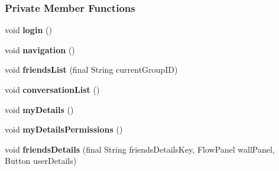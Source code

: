 \subsubsection*{Private Member Functions}
\begin{DoxyCompactItemize}
\item 
\hypertarget{classballmerpeak_1_1turtlenet_1_1client_1_1frontend_a0e5a972d2f4619b2ebc2257ae1ca1288}{void {\bfseries login} ()}\label{classballmerpeak_1_1turtlenet_1_1client_1_1frontend_a0e5a972d2f4619b2ebc2257ae1ca1288}

\item 
\hypertarget{classballmerpeak_1_1turtlenet_1_1client_1_1frontend_ae632d3d6bfd5ed81da02b4bf53fc9327}{void {\bfseries navigation} ()}\label{classballmerpeak_1_1turtlenet_1_1client_1_1frontend_ae632d3d6bfd5ed81da02b4bf53fc9327}

\item 
\hypertarget{classballmerpeak_1_1turtlenet_1_1client_1_1frontend_a2fe4471c89ba970c517388d212b617d6}{void {\bfseries friends\-List} (final String current\-Group\-I\-D)}\label{classballmerpeak_1_1turtlenet_1_1client_1_1frontend_a2fe4471c89ba970c517388d212b617d6}

\item 
\hypertarget{classballmerpeak_1_1turtlenet_1_1client_1_1frontend_a87b09347320292a852b37e97c01b2ea2}{void {\bfseries conversation\-List} ()}\label{classballmerpeak_1_1turtlenet_1_1client_1_1frontend_a87b09347320292a852b37e97c01b2ea2}

\item 
\hypertarget{classballmerpeak_1_1turtlenet_1_1client_1_1frontend_aa0f7dea95f68603b6c8e17c8b97733c7}{void {\bfseries my\-Details} ()}\label{classballmerpeak_1_1turtlenet_1_1client_1_1frontend_aa0f7dea95f68603b6c8e17c8b97733c7}

\item 
\hypertarget{classballmerpeak_1_1turtlenet_1_1client_1_1frontend_ace0e354862cbae6e9f10d1c4be6db11d}{void {\bfseries my\-Details\-Permissions} ()}\label{classballmerpeak_1_1turtlenet_1_1client_1_1frontend_ace0e354862cbae6e9f10d1c4be6db11d}

\item 
\hypertarget{classballmerpeak_1_1turtlenet_1_1client_1_1frontend_a8686e8f6959324ea74e98cf8a89eeca0}{void {\bfseries friends\-Details} (final String friends\-Details\-Key, Flow\-Panel wall\-Panel, Button user\-Details)}\label{classballmerpeak_1_1turtlenet_1_1client_1_1frontend_a8686e8f6959324ea74e98cf8a89eeca0}


\end{DoxyCompactItemize}
